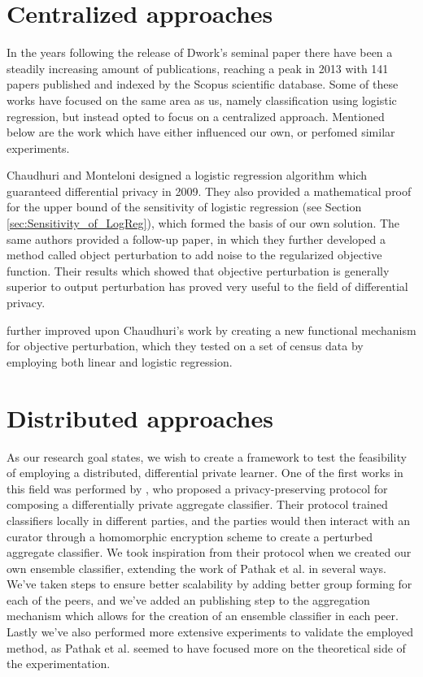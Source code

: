 \section{Centralized approaches}
In the years following the release of Dwork's seminal paper there have been a steadily increasing amount of publications, reaching a peak in 2013 with 141 papers published and indexed by the Scopus scientific database. Some of these works have focused on the same area as us, namely classification using logistic regression, but instead opted to focus on a centralized approach. Mentioned below are the work which have either influenced our own, or perfomed similar experiments. 


Chaudhuri and Monteloni designed a logistic regression algorithm which guaranteed differential privacy in 2009. They also provided a mathematical proof for the upper bound of the sensitivity of logistic regression (see Section \ref{sec:Sensitivity_of_LogReg}), which formed the basis of our own solution. The same authors provided a follow-up paper\citep{chaudhuri2011riskMinimization}, in which they further developed a method called object perturbation to add noise to the regularized objective function. Their results which showed that objective perturbation is generally superior to output perturbation has proved very useful to the field of differential privacy. 

\cite{zhang2012functionMechanism} further improved upon Chaudhuri's work by creating a new functional mechanism for objective perturbation, which they tested on a set of census data by employing both linear and logistic regression. 

\section{Distributed approaches}
As our research goal states, we wish to create a framework to test the feasibility of employing a distributed, differential private learner. One of the first works in this field was performed by  \cite{pathak2010diffprivhomo}, who proposed a privacy-preserving protocol for composing a differentially private aggregate classifier. Their protocol trained classifiers locally in different parties, and the parties would then interact with an curator through a homomorphic encryption scheme to create a perturbed aggregate classifier. We took inspiration from their protocol when we created our own ensemble classifier, extending the work of Pathak et al. in several ways. We've taken steps to ensure better scalability by adding better group forming for each of the peers, and we've added an publishing step to the aggregation mechanism which allows for the creation of an ensemble classifier in each peer. Lastly we've also performed more extensive experiments to validate the employed method, as Pathak et al. seemed to have focused more on the theoretical side of the experimentation. 


